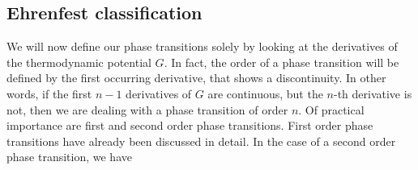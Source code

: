 \subsection{Ehrenfest classification\label{sec:ehrenfest:classification}}
%
We will now define our phase transitions solely by looking at the derivatives of the thermodynamic potential $G$. In fact, the order of a phase transition will be defined by the first occurring derivative, that shows a discontinuity. In other words, if the first $n-1$ derivatives of $G$ are continuous, but the $n$-th derivative is not, then we are dealing with a phase transition of order $n$.
%
Of practical importance are first and second order phase transitions. First order phase transitions 
have already been discussed in detail. In the case of a second order phase transition,
we have

